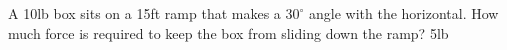 {A 10lb box sits on a 15ft ramp that makes a $30^\circ$ angle with the horizontal. How much force is required to keep the box from sliding down the ramp?
}
{5lb
}
